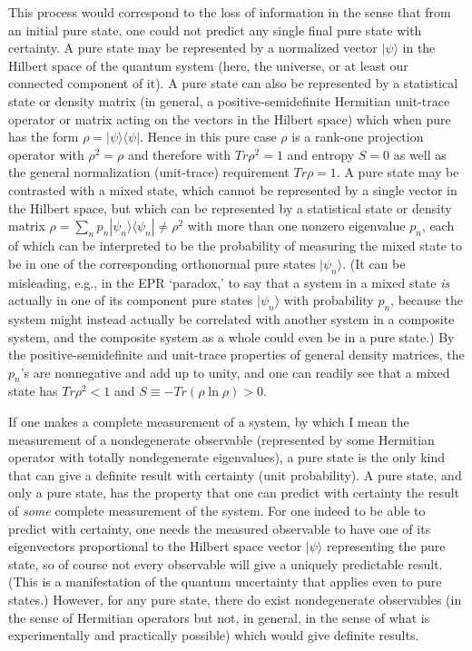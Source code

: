 \documentclass[12pt]{article}
\begin{document}
     This process would correspond to the loss of information in the
sense that
from an initial pure state, one could not predict any single final
pure state
with certainty.  A pure state may be represented by a normalized
vector
$|\psi\rangle$ in the Hilbert space of the quantum system (here, the
universe,
or at least our connected component of it).  A pure state can also be
represented by a statistical state or density matrix (in general, a
positive-semidefinite Hermitian unit-trace operator or matrix acting
on the
vectors in the Hilbert space) which when pure has the form
$\rho=|\psi\rangle\langle\psi|$.  Hence in this pure case $\rho$ is a
rank-one
projection operator with $\rho^2=\rho$ and therefore with
$Tr\rho^2=1$
and entropy $S=0$ as well as the general normalization (unit-trace)
requirement $Tr\rho=1$.
A pure state may be contrasted with a mixed state, which cannot be
represented
by a single vector in the Hilbert space, but which can be represented
by a
statistical state or density matrix $\rho=\sum_n p_n
|\psi_n\rangle\langle\psi_n| \neq \rho^2$ with more than one nonzero
eigenvalue
$p_n$, each of which can be interpreted to be the probability of
measuring the
mixed state to be in one of the corresponding orthonormal pure states
 $|\psi_n\rangle$.  (It can be misleading, e.g., in the EPR
`paradox,'
 to say that a system in a mixed state
{\it is} actually in one of its component pure states
$|\psi_n\rangle$ with
probability $p_n$, because the system might instead actually be
correlated with
another system in a composite system, and the composite system as a
whole could
even be in a pure state.)  By the positive-semidefinite and
unit-trace
properties of general density matrices, the $p_n$'s are nonnegative
and add up
to unity, and one can readily see that a mixed state has $Tr\rho^2 <
1$ and
$S\equiv -Tr(\rho\ln\rho)>0$.

     If one makes a complete measurement of a system, by which I mean
the
measurement of a nondegenerate observable (represented by some
Hermitian
operator with totally nondegenerate eigenvalues), a pure state is the
only kind
that can give a definite result with certainty (unit probability).  A
pure
state, and only a pure state, has the property that one can predict
with
certainty the result of {\it some} complete measurement of the
system.  For one
indeed to be able to predict with certainty, one needs the measured
observable
to have one of its eigenvectors proportional to the Hilbert space
vector
$|\psi\rangle$ representing the pure state, so of course not every
observable
will give a uniquely predictable result.  (This is a manifestation of
the
quantum uncertainty that applies even to pure states.)  However, for
any pure
state, there do exist nondegenerate observables (in the sense of
Hermitian
operators but not, in general, in the sense of what is experimentally
and
practically possible) which would give definite results.
\end{document}
